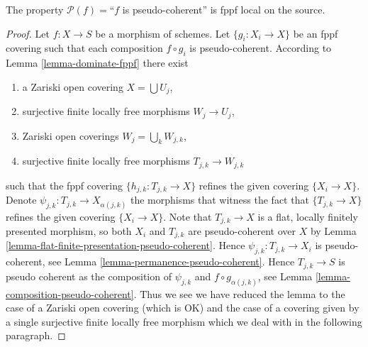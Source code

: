 \begin{lemma}
\label{lemma-pseudo-coherent-fppf-local-source}
The property $\mathcal{P}(f) =$``$f$ is pseudo-coherent''
is fppf local on the source.
\end{lemma}

\begin{proof}
Let $f : X \to S$ be a morphism of schemes.
Let $\{g_i : X_i \to X\}$ be an fppf covering such that each composition
$f \circ g_i$ is pseudo-coherent. According to
Lemma \ref{lemma-dominate-fppf}
there exist
\begin{enumerate}
\item a Zariski open covering $X = \bigcup U_j$,
\item surjective finite locally free morphisms $W_j \to U_j$,
\item Zariski open coverings $W_j = \bigcup_k W_{j, k}$,
\item surjective finite locally free morphisms $T_{j, k} \to W_{j, k}$
\end{enumerate}
such that the fppf covering $\{h_{j, k} : T_{j, k} \to X\}$ refines the given
covering $\{X_i \to X\}$. Denote $\psi_{j, k} : T_{j, k} \to X_{\alpha(j, k)}$
the morphisms that witness the fact that $\{T_{j, k} \to X\}$ refines
the given covering $\{X_i \to X\}$. Note that $T_{j, k} \to X$ is a flat,
locally finitely presented morphism, so both $X_i$ and $T_{j, k}$ are
pseudo-coherent over $X$ by
Lemma \ref{lemma-flat-finite-presentation-pseudo-coherent}.
Hence $\psi_{j, k} : T_{j, k} \to X_i$ is pseudo-coherent, see
Lemma \ref{lemma-permanence-pseudo-coherent}.
Hence $T_{j, k} \to S$ is pseudo coherent as the composition
of $\psi_{j, k}$ and $f \circ g_{\alpha(j, k)}$, see
Lemma \ref{lemma-composition-pseudo-coherent}.
Thus we see we have reduced the lemma to the case of
a Zariski open covering (which is OK) and the case of a covering
given by a single surjective finite locally free morphism which we
deal with in the following paragraph.


\end{proof}
